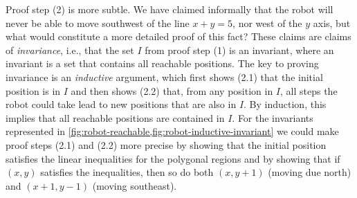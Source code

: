 Proof step (2) is more subtle.
We have claimed informally that the robot will never
  be able to move southwest of the line $x + y = 5$,
  nor west of the $y$ axis,
  but what would constitute a more detailed proof of this fact?
These claims are claims of \emph{invariance},
  i.e., that the set $I$ from proof step (1) is an invariant,
  where an invariant is a set that contains all reachable positions.
The key to proving invariance is an \emph{inductive} argument,
  which first shows (2.1) that the initial position is in $I$
  and then shows (2.2) that, from any position in $I$,
  all steps the robot could take
  lead to new positions that are also in $I$.
By induction, this implies that all reachable positions
  are contained in $I$.
For the invariants represented in
  \cref{fig:robot-reachable,fig:robot-inductive-invariant}
  we could make proof steps (2.1) and (2.2) more precise
  by showing that the initial position
    satisfies the linear inequalities for the polygonal regions
  and by showing that if $(x,y)$ satisfies the inequalities,
    then so do both $(x, y+1)$ (moving due north)
      and $(x+1, y-1)$ (moving southeast).

